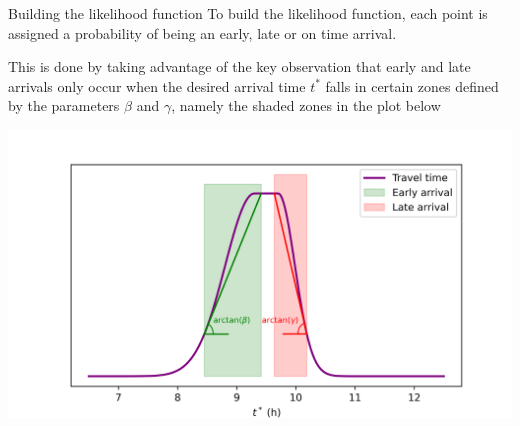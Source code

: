 \documentclass{beamer}
\begin{document}
\begin{frame}{Building the likelihood function}
  To build the likelihood function, each point is assigned a probability of being an early, late or on time arrival.

  This is done by taking advantage of the key observation that early and late arrivals only occur when the desired arrival time \(t^*\) falls in certain zones defined by the parameters \(\beta\) and \(\gamma\), namely the shaded zones in the plot below

  \begin{center}
    \includegraphics[width=.9\textwidth]{tt_early_late}
  \end{center}
\end{frame}
\end{document}
